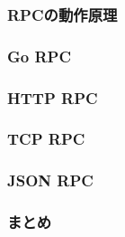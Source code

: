 
\subsubsection{RPCの動作原理}

\subsubsection{Go RPC}

\subsubsection{HTTP RPC}

\subsubsection{TCP RPC}

\subsubsection{JSON RPC}

\subsubsection{まとめ}

